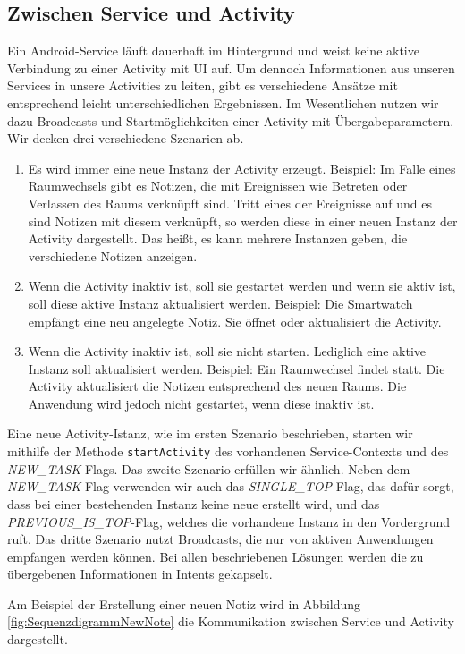 \subsection{Zwischen Service und Activity}
Ein Android-Service läuft dauerhaft im Hintergrund und weist keine aktive Verbindung zu einer Activity mit UI auf. Um dennoch Informationen aus unseren Services in unsere Activities zu leiten, gibt es verschiedene Ansätze mit entsprechend leicht unterschiedlichen Ergebnissen. 
Im Wesentlichen nutzen wir dazu Broadcasts und Startmöglichkeiten einer Activity mit Übergabeparametern. 
Wir decken drei verschiedene Szenarien ab.
\begin{enumerate}
\item{Es wird immer eine neue Instanz der Activity erzeugt. Beispiel: Im Falle eines Raumwechsels gibt es Notizen, die mit Ereignissen wie Betreten oder Verlassen des Raums verknüpft sind. Tritt eines der Ereignisse auf und es sind Notizen mit diesem verknüpft, so werden diese in einer neuen Instanz der Activity dargestellt. Das heißt, es kann mehrere Instanzen geben, die verschiedene Notizen anzeigen.}
\item{Wenn die Activity inaktiv ist, soll sie gestartet werden und wenn sie aktiv ist, soll diese aktive Instanz aktualisiert werden. Beispiel: Die Smartwatch empfängt eine neu angelegte Notiz. Sie öffnet oder aktualisiert die Activity.}
\item{Wenn die Activity inaktiv ist, soll sie nicht starten. Lediglich eine aktive Instanz soll aktualisiert werden. Beispiel: Ein Raumwechsel findet statt. Die Activity aktualisiert die Notizen entsprechend des neuen Raums. Die Anwendung wird jedoch nicht gestartet, wenn diese inaktiv ist.}
\end{enumerate}

Eine neue Activity-Istanz, wie im ersten Szenario beschrieben, starten wir mithilfe der Methode \texttt{startActivity} des vorhandenen Service-Contexts und des \textit{NEW\_TASK}-Flags. Das zweite Szenario erfüllen wir ähnlich. Neben dem \textit{NEW\_TASK}-Flag verwenden wir auch das \textit{SINGLE\_TOP}-Flag, das dafür sorgt, dass bei einer bestehenden Instanz keine neue erstellt wird, und das \textit{PREVIOUS\_IS\_TOP}-Flag, welches die vorhandene Instanz in den Vordergrund ruft. Das dritte Szenario nutzt Broadcasts, die nur von aktiven Anwendungen empfangen werden können. Bei allen beschriebenen Lösungen werden die zu übergebenen Informationen in Intents gekapselt.

Am Beispiel der Erstellung einer neuen Notiz wird in Abbildung \ref{fig:SequenzdigrammNewNote} die Kommunikation zwischen Service und Activity dargestellt.


